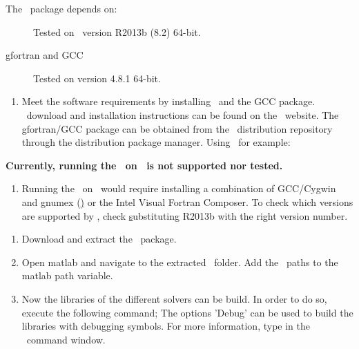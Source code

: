  \label{ch:Installation}
The \PPODESUITE~package depends on:
\begin{description}
  \item[\MATLAB] Tested on \MATLAB~version R2013b (8.2) 64-bit.
  \item[gfortran and GCC] Tested on version 4.8.1 64-bit.
\end{description}

\begin{enumerate}
 \item Meet the software requirements by installing \MATLAB~and the GCC package. \MATLAB~download and installation instructions can be found on the \MATHWORKS~website. The gfortran/GCC package can be obtained from the \nix~distribution repository through the distribution package manager. Using \UBUNTU~for example:
\end{enumerate}

\psection{\MSDOS}
\textbf{Currently, running the \PPODESUITE~on \MSDOS~is not supported nor tested.}
\begin{enumerate}
 \item Running the \PPODESUITE~on \MSDOS~would require installing a combination of GCC/Cygwin and gnumex (\hyperlink{http://gnumex.sourceforge.net/}) or the Intel Visual Fortran Composer. To check which versions are supported by \MATLAB, check \hyperlink{http://www.mathworks.nl/support/compilers/R2013b/} substituting R2013b with the right version number.
\end{enumerate}

\begin{enumerate}[resume]
 \item Download and extract the \PPODESUITE~package.
 \item Open matlab and navigate to the extracted \PPODESUITE~folder. Add the \PPODE~paths to the matlab path variable.
 \item Now the libraries of the different solvers can be build. In order to do so, execute the following command;
 The options 'Debug' can be used to build the libraries with debugging symbols.
 For more information, type  in the \MATLAB~command window.
\end{enumerate}
